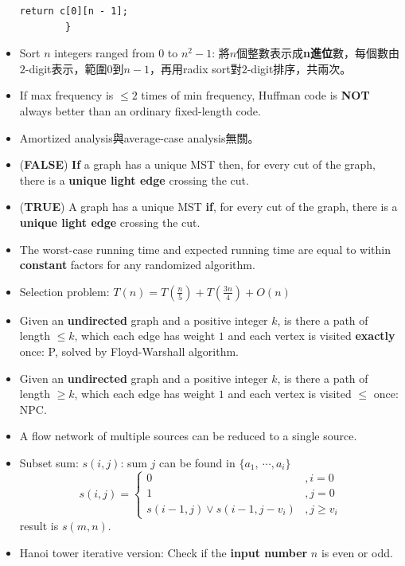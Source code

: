 \begin{itemize}
\begin{lstlisting}[caption={Minimum triangulation.}, captionpos=b]
            return c[0][n - 1];
        }
    \end{lstlisting}
    \item Sort $n$ integers ranged from $0$ to $n^2 - 1$: 將$n$個整數表示成\textbf{n進位}數，每個數由$2$-digit表示，範圍$0$到$n - 1$，再用radix sort對$2$-digit排序，共兩次。
    \item If max frequency is $\le 2$ times of min frequency, Huffman code is \textbf{NOT} always better than an ordinary fixed-length code.
    \item Amortized analysis與average-case analysis無關。
    \item (\textbf{FALSE}) \textbf{If} a graph has a unique MST then, for every cut of the graph, there is a \textbf{unique light edge} crossing the cut.
    \item (\textbf{TRUE}) A graph has a unique MST \textbf{if}, for every cut of the graph, there is a \textbf{unique light edge} crossing the cut.
    \item The worst-case running time and expected running time are equal to within \textbf{constant} factors for any randomized algorithm.
    \item Selection problem: $T(n) = T(\frac{n}{5}) + T(\frac{3n}{4}) + O(n)$
    \item Given an \textbf{undirected} graph and a positive integer $k$, is there a path of length $\le k$, which each edge has weight $1$ and each vertex is visited \textbf{exactly} once: P, solved by Floyd-Warshall algorithm.
    \item Given an \textbf{undirected} graph and a positive integer $k$, is there a path of length $\ge k$, which each edge has weight $1$ and each vertex is visited $\le$ once: NPC.
    \item A flow network of multiple sources can be reduced to a single source.
    \item Subset sum: $s(i, j)$: sum $j$ can be found in $\{a_1, \ \cdots, a_i\}$ \begin{equation}
        s(i, j) = \begin{cases}
            0 &, i = 0 \\
            1 &, j = 0 \\
            s(i - 1, j) \lor s(i - 1, j - v_i) &, j \ge v_i
        \end{cases}
    \end{equation} result is $s(m, n)$.
    \item Hanoi tower iterative version: Check if the \textbf{input number} $n$ is even or odd. \\ 

\end{itemize}
